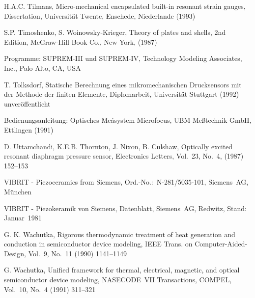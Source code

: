 \begin{thebibliography}{xxx}
 H.A.C. Tilmans, Micro-mechanical encapsulated built-in resonant strain
 gauges, Dissertation, Universität Twente, Enschede, Niederlande (1993)

 S.P. Timoshenko, S. Woinowsky-Krieger, Theory of plates and shells,
 2nd Edition, McGraw-Hill Book Co., New York, (1987)

 Programme: SUPREM-III und SUPREM-IV, Technology Modeling Associates, Inc.,
 Palo Alto, CA, USA


 T. Tolksdorf, Statische Berechnung eines mikromechanischen Drucksensors
 mit der Methode der finiten Elemente, Diplomarbeit, Universität Stuttgart
 (1992) unveröffentlicht

 Bedienungsanleitung: Optisches Meásystem Microfocus, UBM-Meßtechnik GmbH,
 Ettlingen (1991)

 D. Uttamchandi, K.E.B. Thornton, J. Nixon, B. Culshaw, Optically excited
 resonant diaphragm pressure sensor, Electronics Letters, Vol.~23, No.~4,
 (1987) 152--153


 VIBRIT - Piezoceramics from Siemens, Ord.-No.:~N-281/5035-101, Siemens~AG,
 München

 VIBRIT - Piezokeramik von Siemens, Datenblatt, Siemens~AG, Redwitz,
 Stand: Januar~1981


 G. K. Wachutka, Rigorous thermodynamic treatment of heat generation and
 conduction in semiconductor device modeling, IEEE Trans. on
 Computer-Aided-Design, Vol.~9, No.~11 (1990) 1141--1149

 G. Wachutka, Unified framework for thermal, electrical, magnetic, and
 optical semiconductor device modeling, NASECODE~VII Transactions, COMPEL,
 Vol.~10, No.~4 (1991) 311--321


\end{thebibliography}
